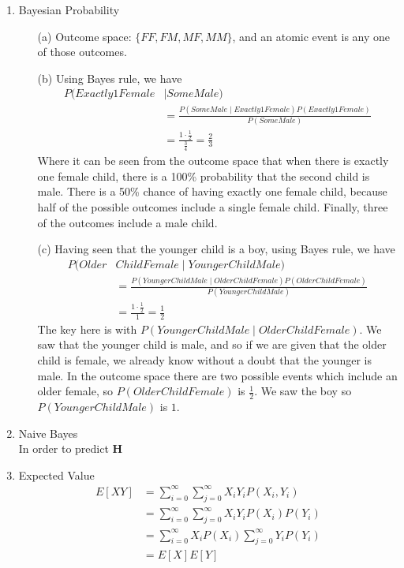 \documentclass[12pt]{article}
\begin{document}
\begin{enumerate}
\begin{enumerate}
  \end{enumerate}
  
  \item Bayesian Probability \\
  	\begin{enumerate}
  		\item[(a)] Outcome space: $\{FF, FM, MF, MM\}$, and an atomic event is any one of those outcomes. 
  		\item[(b)] Using Bayes rule, we have \\
	  		\begin{align*}
	  			 P(Exactly 1 Female &\mid Some Male ) \\  &= \frac{P( Some Male \mid Exactly 1 Female) P(Exactly 1 Female)}{P(Some Male)} \\
	  			 & = \frac{1 \cdot \frac{1}{2}}{\frac{3}{4}} = \frac{2}{3}
	  		\end{align*} 
	  		Where it can be seen from the outcome space that when there is exactly one female child, there is a 100\% probability that the second child is male. There is a 50\% chance of having exactly one female child, because half of the possible outcomes include a single female child. Finally, three of the outcomes include a male child. \\
		\item[(c)] Having seen that the younger child is a boy, using Bayes rule, we have
	  		\begin{align*}
	  			 P( Older & Child Female \mid Younger Child Male ) \\
	  			  &= \frac{P( Younger Child Male \mid Older Child Female ) P(Older Child Female)}{P(Younger Child Male)} \\
	  			 & = \frac{1 \cdot \frac{1}{2}}{1} = \frac{1}{2}
	  		\end{align*} 
	  		The key here is with $P( Younger Child Male \mid Older Child Female )$. We saw that the younger child is male, and so if we are given that the older child is female, we already know without a doubt that the younger is male. In the outcome space there are two possible events which include an older female, so $P(Older Child Female)$ is $\frac{1}{2}$. We saw the boy so $P(Younger Child Male)$ is $1$.
	  	 
	  		
  	\end{enumerate}
  	
  	\item Naive Bayes \\
  		In order to predict $\textbf{H}$ 
  	
  	\item Expected Value \\
	  	\begin{align*}
		  	E[XY] &= \sum_{i=0}^{\infty}\sum_{j=0}^{\infty}X_i Y_iP(X_i,Y_i) \\
		  	&= \sum_{i=0}^{\infty}\sum_{j=0}^{\infty}X_i Y_iP(X_i)P(Y_i) \\
		  	&= \sum_{i=0}^{\infty} X_i P(X_i)\sum_{j=0}^{\infty}Y_i P(Y_i) \\
		  	&= E[X]E[Y]
	  	\end{align*}
  	
\end{enumerate}
\end{document}
